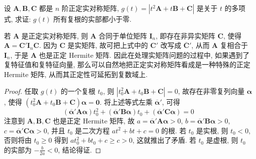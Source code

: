 \documentclass[../../main.tex]{subfiles}
\begin{document}
\begin{example}
设 \(\boldsymbol{A},\boldsymbol{B},\boldsymbol{C}\) 都是 \(n\) 阶正定实对称矩阵, \(g(t)=|t^2\boldsymbol{A}+t\boldsymbol{B}+\boldsymbol{C}|\) 是关于 \(t\) 的多项式, 求证: \(g(t)\) 所有复根的实部都小于零.
\end{example}
\begin{remark}
若 \(\boldsymbol{A}\) 是正定实对称矩阵, 则 \(\boldsymbol{A}\) 合同于单位矩阵 \(\boldsymbol{I}_n\), 即存在非异实矩阵 \(\boldsymbol{C}\), 使得 \(\boldsymbol{A}=\boldsymbol{C}'\boldsymbol{I}_n\boldsymbol{C}\). 因为 \(\boldsymbol{C}\) 是实矩阵, 故可把上式中的 \(\boldsymbol{C}'\) 改写成 \(\overline{\boldsymbol{C}}'\), 从而 \(\boldsymbol{A}\) 复相合于 \(\boldsymbol{I}_n\), 于是 \(\boldsymbol{A}\) 也是正定 Hermite 矩阵. 因此在处理实矩阵问题的过程中, 如果遇到了复特征值和复特征向量, 那么可以自然地把正定实对称矩阵看成是一种特殊的正定 Hermite 矩阵, 从而其正定性可延拓到复数域上. 
\end{remark}
\begin{proof}
任取 \(g(t)\) 的一个复根 \(t_0\), 则 \(|t_0^2\boldsymbol{A}+t_0\boldsymbol{B}+\boldsymbol{C}| = 0\), 故存在非零复列向量 \(\boldsymbol{\alpha}\), 使得 \((t_0^2\boldsymbol{A}+t_0\boldsymbol{B}+\boldsymbol{C})\boldsymbol{\alpha}=\boldsymbol{0}\). 将上述等式左乘 \(\overline{\boldsymbol{\alpha}}'\), 可得
\[(\overline{\boldsymbol{\alpha}}'\boldsymbol{A}\boldsymbol{\alpha})t_0^2+(\overline{\boldsymbol{\alpha}}'\boldsymbol{B}\boldsymbol{\alpha})t_0+(\overline{\boldsymbol{\alpha}}'\boldsymbol{C}\boldsymbol{\alpha}) = 0\]
注意到 \(\boldsymbol{A},\boldsymbol{B},\boldsymbol{C}\) 也是正定 Hermite 矩阵, 故 \(a=\overline{\boldsymbol{\alpha}}'\boldsymbol{A}\boldsymbol{\alpha}>0\), \(b=\overline{\boldsymbol{\alpha}}'\boldsymbol{B}\boldsymbol{\alpha}>0\), \(c=\overline{\boldsymbol{\alpha}}'\boldsymbol{C}\boldsymbol{\alpha}>0\), 并且 \(t_0\) 是二次方程 \(at^2 + bt + c = 0\) 的根. 若 \(t_0\) 是实根, 则 \(t_0<0\), 否则将由 \(t_0\geqslant 0\) 得到 \(at_0^2+bt_0 + c\geqslant  c>0\), 这就推出了矛盾. 若 \(t_0\) 是虚根, 则 \(t_0\) 的实部为 \(-\frac{b}{2a}<0\), 结论得证. 
\end{proof}
\end{document}
